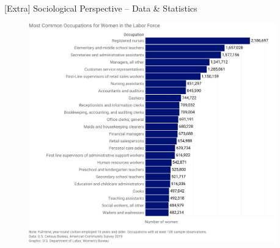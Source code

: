 \documentclass[usenames,dvipsnames]{beamer}
\begin{document}
    
    \begin{frame}[noframenumbering]{[Extra] Sociological Perspective -- Data \& Statistics}
        \begin{figure}
            \begin{columns}
                \begin{column}{0.6\linewidth}
                    \vspace{\medskipamount}
                    \centering
                    \includegraphics[width=\textwidth]{figures/dol_most_common_occupations_women.pdf}
                \end{column}
                \begin{column}{.275\linewidth}
                \end{column}
            \end{columns}
        \end{figure}
    \end{frame}
    
\end{document}
